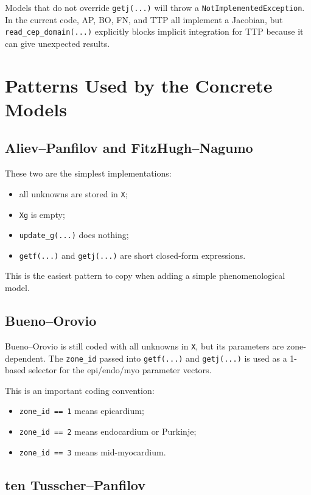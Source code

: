 \documentclass[11pt]{article}
\begin{document}
Models that do not override \texttt{getj(...)} will throw a \texttt{NotImplementedException}. In the current code, AP, BO, FN, and TTP all implement a Jacobian, but \texttt{read\_cep\_domain(...)} explicitly blocks implicit integration for TTP because it can give unexpected results.

\section{Patterns Used by the Concrete Models}

\subsection{Aliev--Panfilov and FitzHugh--Nagumo}

These two are the simplest implementations:
\begin{itemize}[leftmargin=*]
\item all unknowns are stored in \texttt{X};
\item \texttt{Xg} is empty;
\item \texttt{update\_g(...)} does nothing;
\item \texttt{getf(...)} and \texttt{getj(...)} are short closed-form expressions.
\end{itemize}

This is the easiest pattern to copy when adding a simple phenomenological model.

\subsection{Bueno--Orovio}

Bueno--Orovio is still coded with all unknowns in \texttt{X}, but its parameters are zone-dependent. The \texttt{zone\_id} passed into \texttt{getf(...)} and \texttt{getj(...)} is used as a 1-based selector for the epi/endo/myo parameter vectors.

This is an important coding convention:
\begin{itemize}[leftmargin=*]
\item \texttt{zone\_id == 1} means epicardium;
\item \texttt{zone\_id == 2} means endocardium or Purkinje;
\item \texttt{zone\_id == 3} means mid-myocardium.
\end{itemize}

\subsection{ten Tusscher--Panfilov}
\end{document}
